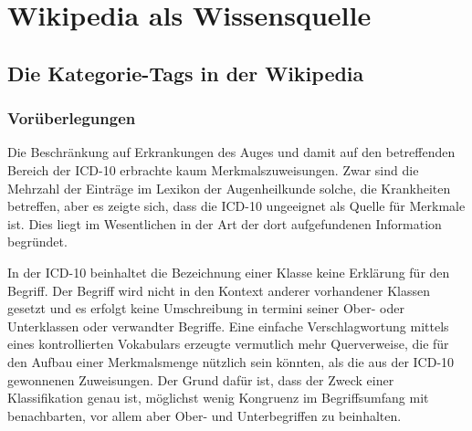 \documentclass[pagesize,DIV=calc,12pt,final]{scrreprt}
\begin{document}
\section{Wikipedia als Wissensquelle}

\subsection{Die Kategorie-Tags in der Wikipedia}

\subsubsection{Vorüberlegungen}

Die Beschränkung auf Erkrankungen des Auges und damit auf den betreffenden Bereich der ICD-10 erbrachte kaum Merkmalszuweisungen.
Zwar sind die Mehrzahl der Einträge im Lexikon der Augenheilkunde solche, die Krankheiten betreffen, aber es zeigte sich, dass die ICD-10 ungeeignet als Quelle für Merkmale ist. 
Dies liegt im Wesentlichen in der Art der dort aufgefundenen Information begründet. 

In der ICD-10 beinhaltet die Bezeichnung einer Klasse keine Erklärung für den Begriff. 
Der Begriff wird nicht in den Kontext anderer vorhandener Klassen gesetzt und es erfolgt keine Umschreibung in termini seiner Ober- oder Unterklassen oder verwandter Begriffe. 
Eine einfache Verschlagwortung mittels eines kontrollierten Vokabulars erzeugte vermutlich mehr Querverweise, die für den Aufbau einer Merkmalsmenge nützlich sein könnten, als die aus der ICD-10 gewonnenen Zuweisungen. 
Der Grund dafür ist, dass der Zweck einer Klassifikation genau ist, möglichst wenig Kongruenz im Begriffsumfang mit benachbarten, vor allem aber Ober- und Unterbegriffen zu beinhalten. 
\end{document}
